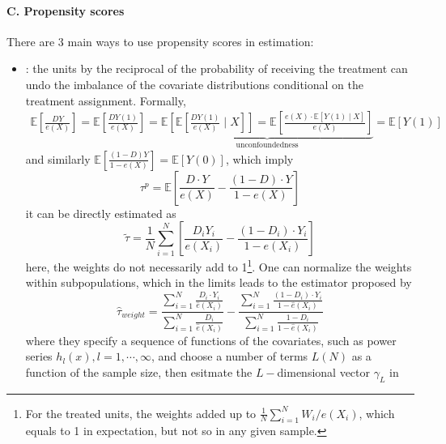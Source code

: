 \documentclass[twoside]{article}
\begin{document}
\paragraph*{C. Propensity scores}
There are 3 main ways to use propensity scores in estimation:
\begin{itemize}
    \item {}: the units by the reciprocal of the probability of receiving the treatment can undo the imbalance of the covariate distributions conditional on the treatment assignment. Formally,
    \begin{align*}
        \mathbb{E} \left[\frac{DY}{e(X)}\right] = \mathbb{E} \left[\frac{DY(1)}{e(X)}\right] = \underbrace{\mathbb{E}\left[\mathbb{E}\left[ \frac{DY(1)}{e(X)} \mid X \right]\right] = \mathbb{E} \left[ \frac{e(X)\cdot \mathbb{E}\left[Y(1)\mid X\right]}{e(X)} \right]}_{\text{unconfoundedness}} = \mathbb{E}\left[Y(1)\right]
    \end{align*}
    and similarly $\mathbb{E}\left[\frac{(1-D)Y}{1-e(X)}\right]=\mathbb{E}\left[Y(0)\right]$, which imply 
    \begin{equation*}
        \tau^p = \mathbb{E} \left[\frac{D\cdot Y}{e(X)} - \frac{\left(1-D\right)\cdot Y}{1-e(X)}\right]
    \end{equation*} 
    it can be directly estimated as 
    \begin{equation*}
        \tilde{\tau} = \frac{1}{N} \sum^N_{i=1} \left[ \frac{D_i Y_i}{e(X_i)} - \frac{(1-D_i)\cdot Y_i}{1-e(X_i)} \right]
    \end{equation*}
    here, the weights do not necessarily add to 1\footnote{For the treated units, the weights added up to $\frac{1}{N}\sum^N_{i=1}W_i/e(X_i)$, which equals to 1 in expectation, but not so in any given sample.}. One can normalize the weights within subpopulations, which in the limits leads to the estimator proposed by \citet{hirano2003efficient}
    \begin{equation*}
        \hat{\tau}_{weight} = \frac{\sum^N_{i=1} \frac{D_i\cdot Y_i}{\hat{e}(X_i)}}{\sum^N_{i=1}\frac{D_i}{\hat{e}(X_i)}} - \frac{\sum^N_{i=1} \frac{(1-D_i)\cdot Y_i}{1-\hat{e}(X_i)} }{\sum^N_{i=1} \frac{1-D_i}{1-\hat{e}(X_i)}}
    \end{equation*}
    where they specify a sequence of functions of the covariates, such as power series $h_l(x),l=1,\cdots,\infty$, and choose a number of terms $L(N)$ as a function of the sample size, then esitmate the $L-$dimensional vector $\gamma_L$ in 
    \begin{equation*}

\end{equation*}
\end{itemize}
\end{document}
